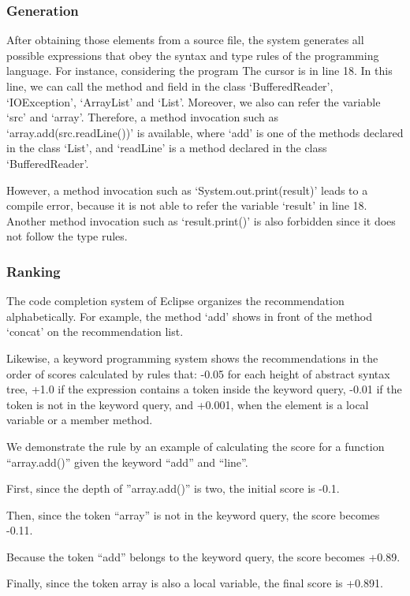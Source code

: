 \documentclass[PRO,english]{ipsj}
\begin{document}
\subsubsection{Generation}
After obtaining those elements from a source file, the system generates all possible expressions that obey the syntax and type rules of the programming language. For instance, considering the program
The cursor is in line 18. In this line, we can call the method and field in the class ‘BufferedReader’, ‘IOException’, ‘ArrayList’ and ‘List’. Moreover, we also can refer the variable ‘src’ and ‘array’. Therefore, a method invocation such as ‘array.add(src.readLine())’ is available, where ‘add’ is one of the methods declared in the class ‘List’, and ‘readLine’ is a method declared in the class ‘BufferedReader’. 

However, a method invocation such as ‘System.out.print(result)’ leads to a compile error, because it is not able to refer the variable ‘result’ in line 18. Another method invocation such as ‘result.print()’ is also forbidden since it does not follow the type rules.


\subsubsection{Ranking}
The code completion system of Eclipse organizes the recommendation alphabetically. For example, the method ‘add’ shows in front of the method ‘concat’ on the recommendation list.

Likewise, a keyword programming system shows the recommendations in the order of scores calculated by rules that:
-0.05 for each height of abstract syntax tree,
+1.0 if the expression contains a token inside the keyword query,
-0.01 if the token is not in the keyword query, and
+0.001, when the element is a local variable or a member method.

We demonstrate the rule by an example of calculating the score for a function “array.add()” given the keyword “add” and “line”.

First, since the depth of ”array.add()” is two, the initial score is -0.1.

Then, since the token “array” is not in the keyword query, the score becomes -0.11.

Because the token “add” belongs to the keyword query, the score becomes +0.89.

Finally, since the token array is also a local variable, the final score is +0.891.
\end{document}
